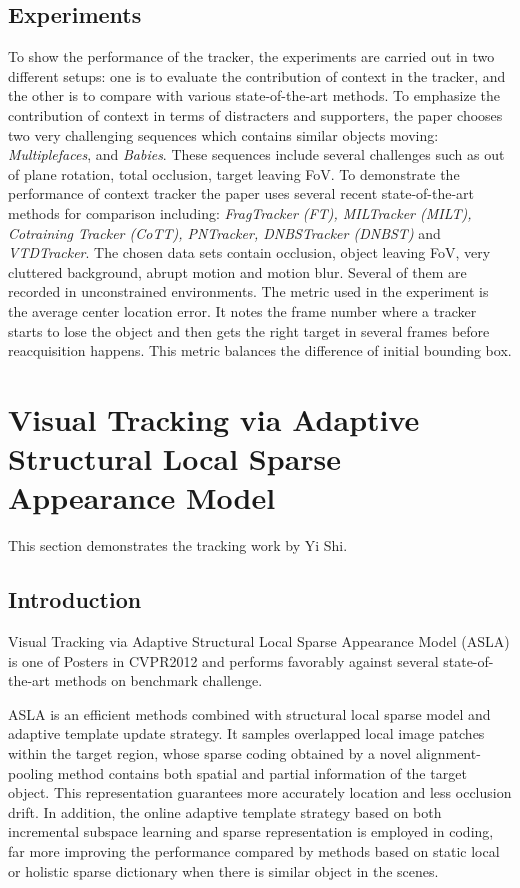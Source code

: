 \documentclass{article}
\begin{document}
\subsection{Experiments}
    To show the performance of the tracker, the experiments are carried out in two different setups: one is to evaluate the contribution of context in the tracker, and the other is to compare with various state-of-the-art methods.
    \newline
    To emphasize the contribution of context in terms of distracters and supporters, the paper chooses two very challenging sequences which contains similar objects moving:  \textit{Multiplefaces}, and  \textit{Babies}. These sequences include several challenges such as out of plane rotation, total occlusion, target leaving FoV.
    \newline
    To demonstrate the performance of context tracker the paper uses several recent state-of-the-art methods for comparison including: \textit{FragTracker (FT), MILTracker (MILT), Cotraining Tracker (CoTT), PNTracker, DNBSTracker (DNBST)} and \textit{VTDTracker}. The chosen data sets contain occlusion, object leaving FoV, very cluttered background, abrupt motion and motion blur. Several of them are recorded in unconstrained environments. The metric used in the experiment is the average center location error. It notes the frame number where a tracker starts to lose the object and then gets the right target in several frames before reacquisition happens. This metric balances the difference of initial bounding box.


\section{Visual Tracking via Adaptive Structural Local Sparse Appearance Model}
This section demonstrates the tracking work by Yi Shi.

\subsection{Introduction}
Visual Tracking via Adaptive Structural Local Sparse Appearance Model (ASLA) is one of Posters in CVPR2012 and performs favorably against several state-of-the-art methods on benchmark challenge.

ASLA is an efficient methods combined with structural local sparse model and adaptive template update strategy. It samples overlapped local image patches within the target region, whose sparse coding obtained by a novel alignment-pooling method contains both spatial and partial information of the target object. This representation guarantees more accurately location and less occlusion drift. In addition, the online adaptive template strategy based on both incremental subspace learning and sparse representation is employed in coding, far more improving the performance compared by methods based on static local or holistic sparse dictionary when there is similar object in the scenes.
\end{document}
